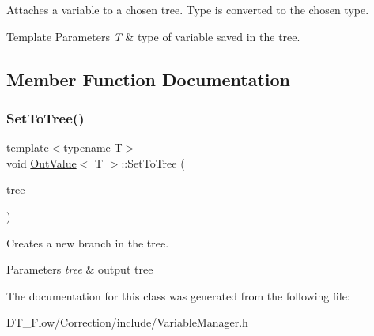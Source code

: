 Attaches a variable to a chosen tree. Type is converted to the chosen type. 


\begin{DoxyTemplParams}{Template Parameters}
{\em T} & type of variable saved in the tree. \\
\hline
\end{DoxyTemplParams}


\subsection{Member Function Documentation}
\mbox{\label{classOutValue_a33ee7e5f1148debbdaa83abfa1c78379}} 
\subsubsection{\texorpdfstring{Set\+To\+Tree()}{SetToTree()}}
{\footnotesize\ttfamily template$<$typename T$>$ \\
void \mbox{\hyperlink{classOutValue}{Out\+Value}}$<$ T $>$\+::Set\+To\+Tree (\begin{DoxyParamCaption}\item[{T\+Tree $\ast$}]{tree }\end{DoxyParamCaption})\hspace{0.3cm}{\ttfamily [inline]}}



Creates a new branch in the tree. 


\begin{DoxyParams}{Parameters}
{\em tree} & output tree \\
\hline
\end{DoxyParams}


The documentation for this class was generated from the following file\+:\begin{DoxyCompactItemize}
\item 
D\+T\+\_\+\+Flow/\+Correction/include/Variable\+Manager.\+h\end{DoxyCompactItemize}
